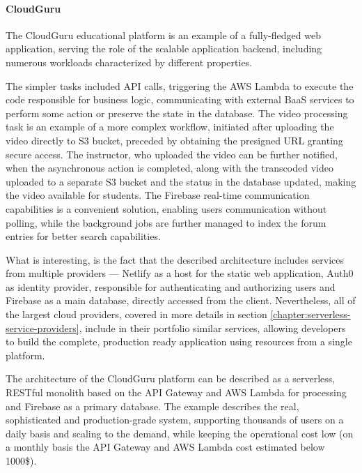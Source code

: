 
\paragraph*{CloudGuru} \label{chapter:serverless-suitability-cloudguru}

The CloudGuru educational platform is an example of a fully-fledged web application, serving the role of the scalable application backend, including numerous workloads characterized by different properties.

The simpler tasks included API calls, triggering the AWS Lambda to execute the code responsible for business logic, communicating with external BaaS services to perform some action or preserve the state in the database.
The video processing task is an example of a more complex workflow, initiated after uploading the video directly to S3 bucket, preceded by obtaining the presigned URL granting secure access.
The instructor, who uploaded the video can be further notified, when the asynchronous action is completed, along with the transcoded video uploaded to a separate S3 bucket and the status in the database updated, making the video available for students.
The Firebase real-time communication capabilities is a convenient solution, enabling users communication without polling, while the background jobs are further managed to index the forum entries for better search capabilities.

What is interesting, is the fact that the described architecture includes services from multiple providers --- Netlify as a host for the static web application, Auth0 as identity provider, responsible for authenticating and authorizing users and Firebase as a main database, directly accessed from the client. Nevertheless, all of the largest cloud providers, covered in more details in section \ref{chapter:serverless-service-providers}, include in their portfolio similar services, allowing developers to build the complete, production ready application using resources from a single platform.

The architecture of the CloudGuru platform can be described as a serverless, RESTful monolith based on the API Gateway and AWS Lambda for processing and Firebase as a primary database.
The example describes the real, sophisticated and production-grade system, supporting thousands of users on a daily basis and scaling to the demand, while keeping the operational cost low (on a monthly basis the API Gateway and AWS Lambda cost estimated below 1000\$).

